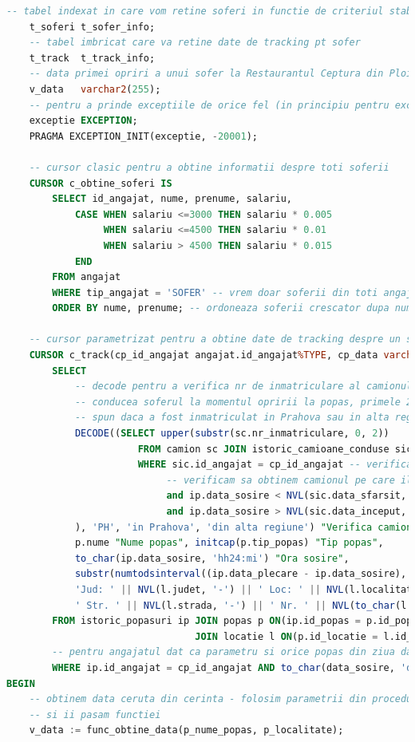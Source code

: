 \documentclass[12pt, a4paper]{article}
\begin{document}
\begin{lstlisting}[language=SQL]
    -- tabel indexat in care vom retine soferi in functie de criteriul stabilit
    t_soferi t_sofer_info;
    -- tabel imbricat care va retine date de tracking pt sofer
    t_track  t_track_info;
    -- data primei opriri a unui sofer la Restaurantul Ceptura din Ploiesti
    v_data   varchar2(255);
    -- pentru a prinde exceptiile de orice fel (in principiu pentru exceptiile aplicatiei)
    exceptie EXCEPTION;
    PRAGMA EXCEPTION_INIT(exceptie, -20001);
    
    -- cursor clasic pentru a obtine informatii despre toti soferii
    CURSOR c_obtine_soferi IS
        SELECT id_angajat, nume, prenume, salariu,
            CASE WHEN salariu <=3000 THEN salariu * 0.005
                 WHEN salariu <=4500 THEN salariu * 0.01
                 WHEN salariu > 4500 THEN salariu * 0.015
            END 
        FROM angajat
        WHERE tip_angajat = 'SOFER' -- vrem doar soferii din toti angajatii
        ORDER BY nume, prenume; -- ordoneaza soferii crescator dupa nume si prenume
    
    -- cursor parametrizat pentru a obtine date de tracking despre un sofer dat dupa id-ul de angajat
    CURSOR c_track(cp_id_angajat angajat.id_angajat%TYPE, cp_data varchar2) IS
        SELECT 
			-- decode pentru a verifica nr de inmatriculare al camionului pe care il 
			-- conducea soferul la momentul opririi la popas, primele 2 caractere ne
			-- spun daca a fost inmatriculat in Prahova sau in alta regiune
			DECODE((SELECT upper(substr(sc.nr_inmatriculare, 0, 2))
                       FROM camion sc JOIN istoric_camioane_conduse sic ON(sc.id_camion = sic.id_camion)
                       WHERE sic.id_angajat = cp_id_angajat -- verificam angajatul
							-- verificam sa obtinem camionul pe care il conducea la momentul dat
                            and ip.data_sosire < NVL(sic.data_sfarsit, sysdate)
                            and ip.data_sosire > NVL(sic.data_inceput, sysdate)
            ), 'PH', 'in Prahova', 'din alta regiune') "Verifica camion din Prahova", 
            p.nume "Nume popas", initcap(p.tip_popas) "Tip popas",
            to_char(ip.data_sosire, 'hh24:mi') "Ora sosire",
            substr(numtodsinterval((ip.data_plecare - ip.data_sosire), 'DAY'), 12, 5) "Durata",
            'Jud: ' || NVL(l.judet, '-') || ' Loc: ' || NVL(l.localitate, '-') ||
            ' Str. ' || NVL(l.strada, '-') || ' Nr. ' || NVL(to_char(l.nr), '-') "Locatie popas"
        FROM istoric_popasuri ip JOIN popas p ON(ip.id_popas = p.id_popas)
                                 JOIN locatie l ON(p.id_locatie = l.id_locatie)
		-- pentru angajatul dat ca parametru si orice popas din ziua data
        WHERE ip.id_angajat = cp_id_angajat AND to_char(data_sosire, 'dd-mm-yyyy') = cp_data;
BEGIN
    -- obtinem data ceruta din cerinta - folosim parametrii din procedura 
	-- si ii pasam functiei
    v_data := func_obtine_data(p_nume_popas, p_localitate);
    

\end{lstlisting}
\end{document}
